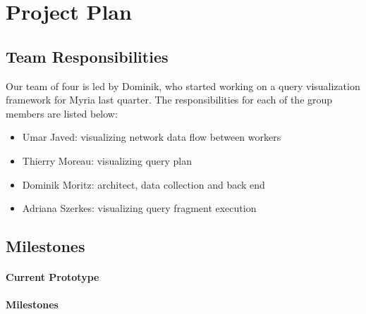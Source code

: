 \section{Project Plan}

\subsection{Team Responsibilities}

Our team of four is led by Dominik, who started working on a query visualization framework for Myria last quarter. The responsibilities for each of the group members are listed below:

\begin {itemize}
    \item Umar Javed: visualizing network data flow between workers
    \item Thierry Moreau: visualizing query plan
    \item Dominik Moritz: architect, data collection and back end
    \item Adriana Szerkes: visualizing query fragment execution
\end{itemize}

\subsection{Milestones}

\paragraph{Current Prototype} 

\paragraph{Milestones}


